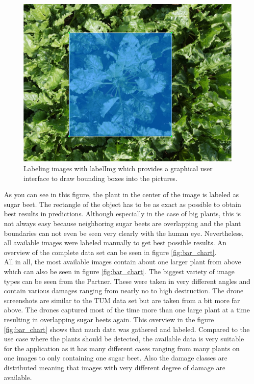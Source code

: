 \begin{figure}[htb!]
	\centering
	\includegraphics[scale=0.2]{figures/labeling.png}
	\caption{Labeling images with labelImg which provides a graphical user interface to draw bounding boxes into the pictures.}
	\label{fig:labeling}
\end{figure}

As you can see in this figure, the plant in the center of the image is labeled as sugar beet. The rectangle of the object has to be as exact as possible to obtain best results in predictions. Although especially in the case of big plants, this is not always easy because neighboring sugar beets are overlapping and the plant boundaries can not even be seen very clearly with the human eye. Nevertheless, all available images were labeled manually to get best possible results. An overview of the complete data set can be seen in figure \ref{fig:bar_chart}.\\

All in all, the most available images contain about one larger plant from above which can also be seen in figure \ref{fig:bar_chart}. The biggest variety of image types can be seen from the Partner. These were taken in very different angles and contain various damages ranging from nearly no to high destruction. The drone screenshots are similar to the TUM data set but are taken from a bit more far above. The drones captured most of the time more than one large plant at a time resulting in overlapping sugar beets again. This overview in the figure \ref{fig:bar_chart} shows that much data was gathered and labeled. Compared to the use case where the plants should be detected, the available data is very suitable for the application as it has many different cases ranging from many plants on one images to only containing one sugar beet. Also the damage classes are distributed meaning that images with very different degree of damage are available.

